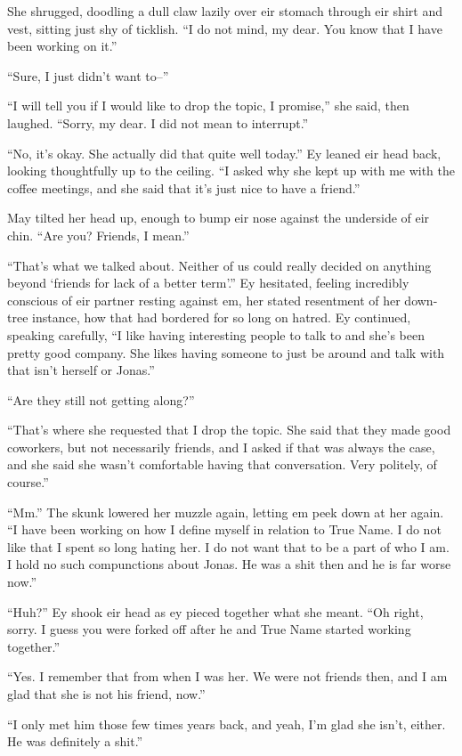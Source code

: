 She shrugged, doodling a dull claw lazily over eir stomach through eir shirt and vest, sitting just shy of ticklish. ``I do not mind, my dear. You know that I have been working on it.''

``Sure, I just didn't want to--''

``I will tell you if I would like to drop the topic, I promise,'' she said, then laughed. ``Sorry, my dear. I did not mean to interrupt.''

``No, it's okay. She actually did that quite well today.'' Ey leaned eir head back, looking thoughtfully up to the ceiling. ``I asked why she kept up with me with the coffee meetings, and she said that it's just nice to have a friend.''

May tilted her head up, enough to bump eir nose against the underside of eir chin. ``Are you? Friends, I mean.''

``That's what we talked about. Neither of us could really decided on anything beyond `friends for lack of a better term'.'' Ey hesitated, feeling incredibly conscious of eir partner resting against em, her stated resentment of her down-tree instance, how that had bordered for so long on hatred. Ey continued, speaking carefully, ``I like having interesting people to talk to and she's been pretty good company. She likes having someone to just be around and talk with that isn't herself or Jonas.''

``Are they still not getting along?''

``That's where she requested that I drop the topic. She said that they made good coworkers, but not necessarily friends, and I asked if that was always the case, and she said she wasn't comfortable having that conversation. Very politely, of course.''

``Mm.'' The skunk lowered her muzzle again, letting em peek down at her again. ``I have been working on how I define myself in relation to True Name. I do not like that I spent so long hating her. I do not want that to be a part of who I am. I hold no such compunctions about Jonas. He was a shit then and he is far worse now.''

``Huh?'' Ey shook eir head as ey pieced together what she meant. ``Oh right, sorry. I guess you were forked off after he and True Name started working together.''

``Yes. I remember that from when I was her. We were not friends then, and I am glad that she is not his friend, now.''

``I only met him those few times years back, and yeah, I'm glad she isn't, either. He was definitely a shit.''

